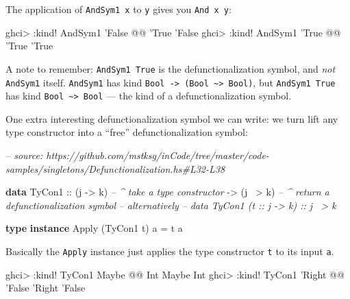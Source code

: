 \documentclass[]{article}
\newenvironment{Shaded}{}{}
\newcommand{\CommentTok}[1]{\textcolor[rgb]{0.38,0.63,0.69}{\textit{#1}}}
\newcommand{\DataTypeTok}[1]{\textcolor[rgb]{0.56,0.13,0.00}{#1}}
\newcommand{\FunctionTok}[1]{\textcolor[rgb]{0.02,0.16,0.49}{#1}}
\newcommand{\KeywordTok}[1]{\textcolor[rgb]{0.00,0.44,0.13}{\textbf{#1}}}
\newcommand{\NormalTok}[1]{#1}
\newcommand{\OtherTok}[1]{\textcolor[rgb]{0.00,0.44,0.13}{#1}}
\begin{document}
The application of \texttt{AndSym1\ x} to \texttt{y} gives you
\texttt{And\ x\ y}:

\begin{Shaded}
\begin{Highlighting}[]
\NormalTok{ghci}\FunctionTok{>} \FunctionTok{:}\NormalTok{kind}\FunctionTok{!} \DataTypeTok{AndSym1}\NormalTok{ '}\DataTypeTok{False} \FunctionTok{@@}\NormalTok{ '}\DataTypeTok{True}
\NormalTok{'}\DataTypeTok{False}
\NormalTok{ghci}\FunctionTok{>} \FunctionTok{:}\NormalTok{kind}\FunctionTok{!} \DataTypeTok{AndSym1}\NormalTok{ '}\DataTypeTok{True}  \FunctionTok{@@}\NormalTok{ '}\DataTypeTok{True}
\NormalTok{'}\DataTypeTok{True}
\end{Highlighting}
\end{Shaded}

A note to remember: \texttt{AndSym1\ \textquotesingle{}True} is the
defunctionalization symbol, and \emph{not} \texttt{AndSym1} itself.
\texttt{AndSym1} has kind
\texttt{Bool\ -\textgreater{}\ (Bool\ \textasciitilde{}\textgreater{}\ Bool)},
but \texttt{AndSym1\ \textquotesingle{}True} has kind
\texttt{Bool\ \textasciitilde{}\textgreater{}\ Bool} --- the kind of a
defunctionalization symbol.

One extra interesting defunctionalization symbol we can write: we turn lift any
type constructor into a ``free'' defunctionalization symbol:

\begin{Shaded}
\begin{Highlighting}[]
\CommentTok{-- source: https://github.com/mstksg/inCode/tree/master/code-samples/singletons/Defunctionalization.hs#L32-L38}

\KeywordTok{data} \DataTypeTok{TyCon1}
\OtherTok{        ::}\NormalTok{ (j }\OtherTok{->}\NormalTok{ k)     }\CommentTok{-- ^ take a type constructor}
        \OtherTok{->}\NormalTok{ (j }\FunctionTok{~>}\NormalTok{ k)     }\CommentTok{-- ^ return a defunctionalization symbol}
\CommentTok{-- alternatively}
\CommentTok{-- data TyCon1 (t :: j -> k) :: j ~> k}

\KeywordTok{type} \KeywordTok{instance} \DataTypeTok{Apply}\NormalTok{ (}\DataTypeTok{TyCon1}\NormalTok{ t) a }\FunctionTok{=}\NormalTok{ t a}
\end{Highlighting}
\end{Shaded}

Basically the \texttt{Apply} instance just applies the type constructor
\texttt{t} to its input \texttt{a}.

\begin{Shaded}
\begin{Highlighting}[]
\NormalTok{ghci}\FunctionTok{>} \FunctionTok{:}\NormalTok{kind}\FunctionTok{!} \DataTypeTok{TyCon1} \DataTypeTok{Maybe} \FunctionTok{@@} \DataTypeTok{Int}
\DataTypeTok{Maybe} \DataTypeTok{Int}
\NormalTok{ghci}\FunctionTok{>} \FunctionTok{:}\NormalTok{kind}\FunctionTok{!} \DataTypeTok{TyCon1}\NormalTok{ '}\DataTypeTok{Right} \FunctionTok{@@}\NormalTok{ '}\DataTypeTok{False}
\NormalTok{'}\DataTypeTok{Right}\NormalTok{ '}\DataTypeTok{False}
\end{Highlighting}
\end{Shaded}
\end{document}
